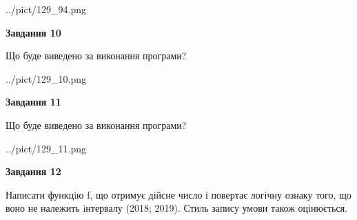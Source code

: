 \documentclass[12pt, ukrainian]{article}
\begin{document}
{\begin {large}
\begin{center}
	{../pict/129_94.png}
\end{center}
\newpage

{\begin {center}\textbf{Завдання 10}\end {center}}

Що буде виведено за виконання програми?\par
\begin{center}
	{../pict/129_10.png}
\end{center}
\newpage

{\begin {center}\textbf{Завдання 11}\end {center}}

Що буде виведено за виконання програми?\par
\begin{center}
	{../pict/129_11.png}
\end{center}
\newpage

{\begin {center}\textbf{Завдання 12}\end {center}}


Написати функцiю f, що отримує дійсне число і повертає логічну ознаку того, що воно не належить iнтервалу (2018; 2019). Стиль запису умови також оцінюється.\par
\newpage

\end {large}}
\end{document}
